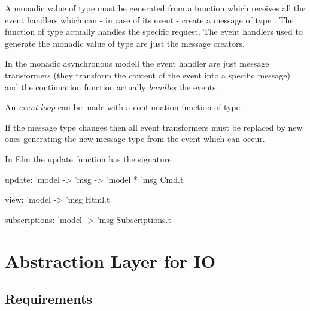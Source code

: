 A monadic value of type  must be generated from a function which
receives all the event handlers which can - in case of its event - create a
message of type . The function of type  actually
handles the specific request. The event handlers used to generate the monadic
value of type   are just the message creators.

In the monadic asynchronous modell the event handler are just message
transformers (they transform the content of the event into a specific message)
and the continuation function actually \emph{handles} the events.

An \emph{event loop} can be made with a continuation function of type .

If the message type changes then all event transformers must be replaced by
new ones generating the new message type from the event which can occur.

In Elm the update function has the signature
\begin{ocaml}
  update: 'model -> 'msg -> 'model * 'msg Cmd.t

  view: 'model -> 'msg Html.t

  subscriptions: 'model -> 'msg Subscriptions.t
\end{ocaml}




\section{Abstraction Layer for IO}

\subsection{Requirements}

